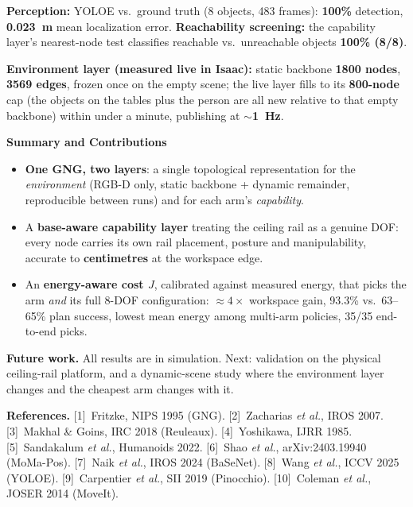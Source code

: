 \documentclass[20pt,a4paper]{extarticle}
\newcommand{\pillsize}{23}
\newcommand{\psection}[1]{%
  \begin{sectionpill}\bfseries\fontsize{\pillsize}{\pillsize}\selectfont #1\end{sectionpill}}
\newcommand{\num}[1]{\textcolor{pblue}{\bfseries #1}}
\newcommand{\lead}[1]{\textbf{#1}}
\begin{document}
\begin{minipage}[t]{0.487\linewidth}
\begin{minipage}[c]{0.55\linewidth}
  \vspace{1.5mm}
  \lead{Perception:} YOLOE vs.\ ground truth (8 objects, 483 frames): \num{100\%}
  detection, \num{0.023~m} mean localization error.
  \lead{Reachability screening:} the capability layer's nearest-node test classifies reachable
  vs.\ unreachable objects \num{100\% (8/8)}.

  \vspace{1.5mm}
  \lead{Environment layer (measured live in Isaac):} static backbone
  \num{1800 nodes}, \num{3569 edges}, frozen once on the empty scene;
  the live layer fills to its \num{800-node} cap (the objects on the tables plus
  the person are all new relative to that empty backbone) within under a minute,
  publishing at \num{$\sim$1~Hz}.
\end{minipage}

\psection{Summary and Contributions}

\begin{keybox}
\begin{itemize}[leftmargin=6mm, topsep=0pt]
  \item \textbf{One GNG, two layers}: a single topological representation for the
        \emph{environment} (RGB-D only, static backbone + dynamic remainder,
        reproducible between runs) and for each arm's \emph{capability}.
  \item A \textbf{base-aware capability layer} treating the ceiling rail as a
        genuine DOF: every node carries its own rail placement, posture and
        manipulability, accurate to \textbf{centimetres} at the workspace edge.
  \item An \textbf{energy-aware cost $J$}, calibrated against measured energy,
        that picks the arm \emph{and} its full 8-DOF configuration:
        $\approx4\times$ workspace gain, 93.3\% vs.\ 63--65\% plan success,
        lowest mean energy among multi-arm policies, 35/35 end-to-end picks.
\end{itemize}
\end{keybox}

\lead{Future work.} All results are in simulation. Next: validation on the
physical ceiling-rail platform, and a dynamic-scene study where the environment
layer changes and the cheapest arm changes with it.

\end{minipage}

\vspace{3mm}
{\fontsize{13}{15.5}\selectfont\color{pgrey}
\textbf{References.}
[1]~Fritzke, NIPS 1995 (GNG).
[2]~Zacharias \textit{et al.}, IROS 2007.
[3]~Makhal \& Goins, IRC 2018 (Reuleaux).
[4]~Yoshikawa, IJRR 1985.
[5]~Sandakalum \textit{et al.}, Humanoids 2022.
[6]~Shao \textit{et al.}, arXiv:2403.19940 (MoMa-Pos).
[7]~Naik \textit{et al.}, IROS 2024 (BaSeNet).
[8]~Wang \textit{et al.}, ICCV 2025 (YOLOE).
[9]~Carpentier \textit{et al.}, SII 2019 (Pinocchio).
[10]~Coleman \textit{et al.}, JOSER 2014 (MoveIt).
\par}
\end{document}
